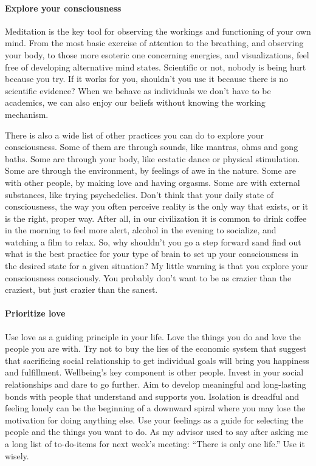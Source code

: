 \documentclass{article}
\begin{document}
\paragraph{Explore your consciousness}
Meditation is the key tool for observing the workings and functioning of your own mind. From the most basic exercise of attention to the breathing, and observing your body, to those more esoteric one concerning energies, and visualizations, feel free of developing alternative mind states. Scientific or not, nobody is being hurt because you try. If it works for you, shouldn't you use it because there is no scientific evidence? When we behave as individuals we don’t have to be academics, we can also enjoy our beliefs without knowing the working mechanism. 

There is also a wide list of other practices you can do to explore your consciousness. Some of them are through sounds, like mantras, ohms and gong baths. Some are through your body, like ecstatic dance or physical stimulation. Some are through the environment, by feelings of awe in the nature. Some are with other people, by making love and having orgasms. Some are with external substances, like trying psychedelics. Don’t think that your daily state of consciousness, the way you often perceive reality is the only way that exists, or it is the right, proper way. After all, in our civilization it is common to drink coffee in the morning to feel more alert, alcohol in the evening to socialize, and watching a film to relax. So, why shouldn't you go a step forward sand find out what is the best practice for your type of brain to set up your consciousness in the desired state for a given situation? My little warning is that you explore your consciousness consciously. You probably don’t want to be as crazier than the craziest, but just crazier than the sanest. 
\paragraph{Prioritize love}
Use love as a guiding principle in your life. Love the things you do and love the people you are with. Try not to buy the lies of the economic system that suggest that sacrificing social relationship to get individual goals will bring you happiness and fulfillment. Wellbeing’s key component is other people. Invest in your social relationships and dare to go further. Aim to develop meaningful and long-lasting bonds with people that understand and supports you. Isolation is dreadful and feeling lonely can be the beginning of a downward spiral where you may lose the motivation for doing anything else. Use your feelings as a guide for selecting the people and the things you want to do. As my advisor used to say after asking me a long list of to-do-items for next week’s meeting: ``There is only one life.'' Use it wisely.
\end{document}
